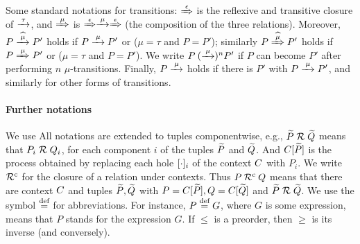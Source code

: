 Some standard notations for transitions: $\Arr\epsilon$ is the 
reflexive and transitive closure of $\arr\tau$, and 
$\Arr \mu $ is $\Arr\epsilon \arr\mu \Arr\epsilon$ (the
composition of the three relations).
Moreover,   
$ P \arcap \mu P'$ holds if $P \arr\mu P'$ or ($\mu =\tau$ and
$P=P'$); similarly 
$ P \Arcap \mu P'$ holds if $P \Arr\mu P'$ or ($\mu =\tau$ and
$P=P'$).
We write $P \:(\arr\mu)^n P'$ if $P$ can become $P'$ after performing
$n$ $\mu$-transitions. Finally, $P \arr\mu$ holds if there is $P'$
with $P \arr\mu P'$, and similarly for other forms of transitions.

\paragraph{Further notations}
We use 
All notations are extended to tuples componentwise,
e.g., $\widetilde P \mathrel{\cal R} \widetilde Q$ means that $P_i \mathrel{\cal R} Q_i$, for each  
component $i$ of the tuples $\widetilde P$ and $\widetilde Q$.
And $C [\widetilde P]$ is the process obtained by replacing each hole
$[\cdot]_{i}$ of the  context $C$ with $P_i$.  
We write $
{\cal R}^{\rm{c}}$ for the closure of a relation under contexts. Thus $P\: {\cal R}^{\rm{c}}\: Q$
means that there are context $C$ and tuples $\widetilde P,\widetilde Q$ with
$P =  C [\widetilde P], Q =  C [\widetilde Q]$ and $\widetilde P \mathrel{\cal R} \widetilde Q$.
We use the symbol $\stackrel{\mbox{\scriptsize def}}{=}$ for abbreviations. For instance, $P \stackrel{\mbox{\scriptsize def}}{=} G $, where
$G$ is some expression, means that $P$ stands for the expression $G$.
If $\leq$ is a preorder, then  $\geq$  is its inverse (and
conversely).


